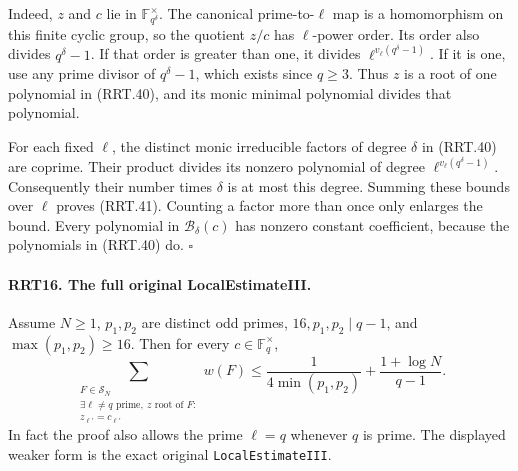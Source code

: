 \documentclass[11pt,a4paper]{article}
\numberwithin{equation}{section}
\theoremstyle{remark}\newtheorem{remark}[theorem]{Remark}
\begin{document}
Indeed, $z$ and $c$ lie in $\mathbb F_{q^\delta}^\times$.
The canonical prime-to-$\ell$ map is a homomorphism on this
finite cyclic group, so the quotient $z/c$ has $\ell$-power
order.  Its order also divides $q^\delta-1$.  If that order
is greater than one, it divides
$\ell^{v_\ell(q^\delta-1)}$.  If it is one, use any prime
divisor of $q^\delta-1$, which exists since $q\ge3$.
Thus $z$ is a root of one polynomial in (RRT.40), and its
monic minimal polynomial divides that polynomial.

For each fixed $\ell$, the distinct monic irreducible factors
of degree $\delta$ in (RRT.40) are coprime.  Their product
divides its nonzero polynomial of degree
$\ell^{v_\ell(q^\delta-1)}$.  Consequently their number
times $\delta$ is at most this degree.  Summing these bounds
over $\ell$ proves (RRT.41).  Counting a factor more than
once only enlarges the bound.  Every polynomial in
$\mathcal B_\delta(c)$ has nonzero constant coefficient,
because the polynomials in (RRT.40) do.
\hfill$\square$

\paragraph{RRT16. The full original LocalEstimateIII.}
\label{claim:RRT16}
Assume $N\ge1$, $p_1,\allowbreak{} p_2$ are distinct odd primes,
$16,\allowbreak{} p_1,\allowbreak{} p_2\mid q-1$, and $\max(p_1,\allowbreak{} p_2)\ge16$.
Then for every $c\in\mathbb F_q^\times$,
\[
 \sum_{\substack{F\in\mathcal S_N\\
        \exists\ell\ne q\text{ prime},\ z\text{ root of }F:\\
                                      z_{\ell'}=c_{\ell'}}}w(F)
        \le\frac1{4\min(p_1,\allowbreak{} p_2)}+\frac{1+\log N}{q-1}.
 \tag{RRT.42}
\]
In fact the proof also allows the prime $\ell=q$ whenever
$q$ is prime.  The displayed weaker form is the exact
original \texttt{Local\allowbreak Estimate\allowbreak III}.
\end{document}
